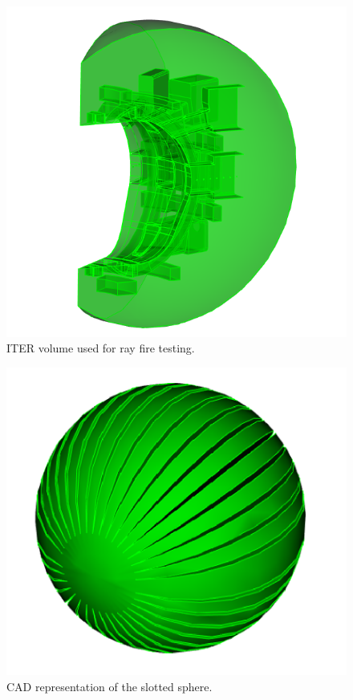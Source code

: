 \documentclass[12pt, a4paper]{article}
\begin{document}
\begin{figure}[H]
  \begin{center}
  \includegraphics[scale=0.4]{iter_rf_vol.png}
  \caption{ITER volume used for ray fire testing.}
  \label{iter_rf_vol}
  \end{center}
\end{figure}

\begin{figure}[H]
  \begin{center}
    \includegraphics[scale=0.25]{ds.png}
    \caption{CAD representation of the slotted sphere.}
    \label{ds_cad}
  \end{center}
\end{figure} 
\end{document}
